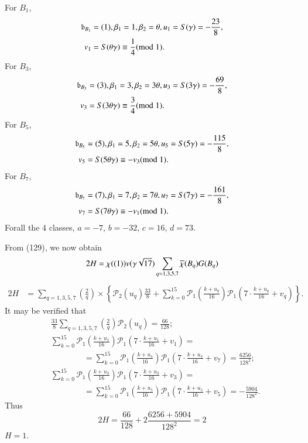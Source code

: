 For $B_{1}$,
\begin{align*}
\mathfrak{b}_{B_{1}} &= (1),\beta_{1}=1, \beta_{2}=\theta,
u_{1}=S(\gamma)=-\dfrac{23}{8},\\
v_{1} &= S(\theta\gamma)\equiv \frac{1}{4}(\rm{mod} \; 1).
\end{align*}
For $B_{3}$,
\begin{align*}
\mathfrak{b}_{B_{3}} &= (3), \beta_{1}=3, \beta_{2}=3\theta,
u_{3}=S(3\gamma)=-\frac{69}{8},\\
v_{3} &= S(3\theta\gamma)\equiv \frac{3}{4}(\rm{mod} \; 1).
\end{align*}
For $B_{5}$,
\begin{align*}
\mathfrak{b}_{B_{5}} &= (5), \beta_{1}=5, \beta_{2}=5\theta,
u_{5}=S(5\gamma)=-\frac{115}{8},\\
v_{5} &= S(5\theta\gamma)\equiv -v_{3}(\rm{mod} \; 1).
\end{align*}
For $B_{7}$,
\begin{align*}
\mathfrak{b}_{B_{7}} &= (7), \beta_{1}=7, \beta_{2}=7\theta,
u_{7}=S(7\gamma)=-\frac{161}{8},\\
v_{7} &= S(7\theta\gamma)\equiv -v_{1}(\rm{mod} \; 1).
\end{align*}
For\pageoriginale all the 4 classes, $a=-7$, $b=-32$, $c=16$, $d=73$.

From (129), we now obtain
$$
2H=\chi((1))v(\gamma\sqrt{17})\sum_{q=1,3,5,7}\overline{\chi}(B_{q})G(B_{q})
$$
\ie
{\fontsize{10}{12}\selectfont
\begin{align*}
2H &= \sum_{q=1,3,5,7}\left(\frac{2}{q}\right)\times
\left\{\mathscr{P}_{2}(u_{q})\frac{33}{8}+\sum^{15}_{k=0}\mathscr{P}_{1}\left(\frac{k+u_{q}}{16}\right)\mathscr{P}_{1}\left(7\cdot
\frac{k+u_{q}}{16}+v_{q}\right)\right\}. 
\end{align*}}\relax
It may be verified that
\begin{align*}
&\frac{33}{8}\sum_{q=1,3,5,7}\left(\frac{2}{q}\right)\mathscr{P}_{2}(u_{q})=\frac{66}{128};\\
&
  \sum^{15}_{k=0}\mathscr{P}_{1}\left(\frac{k+u_{1}}{16}\right)\mathscr{P}_{1}\left(7\cdot
  \frac{k+u_{1}}{16}+v_{1}\right)=\\
&\qquad\qquad
  =\sum^{15}_{k=0}\mathscr{P}_{1}\left(\frac{k+u_{7}}{16}\right)\mathscr{P}_{1}\left(7\cdot
  \frac{k+u_{7}}{16}+v_{7}\right)=\frac{6256}{128^{2}};\\
&\sum^{15}_{k=0}\mathscr{P}_{1}\left(\frac{k+u_{3}}{16}\right)\mathscr{P}_{1}\left(7\cdot\frac{k+u_{3}}{16}+v_{3}\right)=\\
&\qquad\qquad
  =\sum^{15}_{k=0}\mathscr{P}_{1}\left(\frac{k+u_{5}}{16}\right)\mathscr{P}_{1}\left(7\cdot
  \frac{k+u_{5}}{16}+v_{5}\right)=-\frac{5904}{128^{2}}. 
\end{align*}
Thus
$$
2H=\frac{66}{128}+2\frac{6256+5904}{128^{2}}=2
$$
\ie $H=1$.

